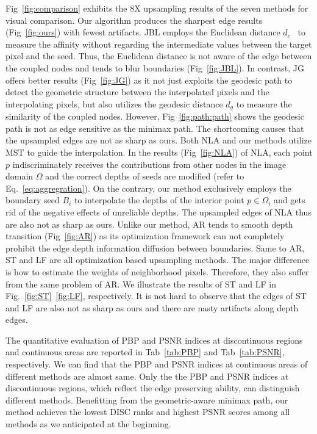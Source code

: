 \documentclass[preprint,10pt,5p,times,twocolumn]{elsarticle}
\begin{document}
Fig~\ref{fig:comparison} exhibits the 8X upsampling results of the seven methods for visual comparison. Our algorithm produces the sharpest edge results (Fig~\ref{fig:ours}) with  fewest artifacts. JBL employs the Euclidean distance $d_e$~\cite{Kopf2007} to measure the affinity without regarding the intermediate values between the target pixel and the seed. Thus, the Euclidean distance is not aware of the edge between the coupled nodes and tends to blur boundaries (Fig~\ref{fig:JBL}). In contrast, JG offers better results (Fig~\ref{fig:JG}) as it not just exploits the geodesic path to detect the geometric structure between the interpolated pixels and the interpolating pixels, but also utilizes the geodesic distance $d_g$ to measure the similarity of the coupled nodes. However, Fig~\ref{fig:path:path} shows the geodesic path is not as edge sensitive as the minimax path. The shortcoming causes that the upsampled edges are not as sharp as ours. Both NLA and our methods utilize MST to guide the interpolation. In the results (Fig~\ref{fig:NLA}) of NLA, each point $p$ indiscriminately receives the contributions from other nodes in the image domain $\Omega$ and the correct depths of seeds are modified (refer to Eq.~\eqref{eq:aggregration}). On the contrary, our method exclusively employs the boundary seed $B_i$ to interpolate the depths of the interior point $p \in \Omega_i$ and gets rid of the negative effects of unreliable depths. The upsampled edges of NLA thus are also not as sharp as ours. Unlike our method, AR tends to smooth depth transition (Fig~\ref{fig:AR}) as its optimization framework can not completely prohibit the edge depth information diffusion between boundaries. Same to AR, ST and LF are all optimization based upsampling methods. The major difference is how to estimate the weights of neighborhood pixels. Therefore, they also suffer from the same problem of AR. We illustrate the results of ST and LF in Fig.~\ref{fig:ST}~\ref{fig:LF}, respectively. It is not hard to observe that the edges of ST and LF  are also not as sharp as ours and there are nasty artifacts along depth edges.

The quantitative evaluation of PBP and PSNR indices at discontinuous regions and continuous areas are reported in Tab~\ref{tab:PBP} and Tab~\ref{tab:PSNR}, respectively. We can find that the PBP and PSNR  indices at continuous areas of different methods are almost same. Only the the PBP and PSNR  indices at discontinuous regions, which reflect the edge preserving ability, can distinguish different methods. Benefitting from the geometric-aware minimax path, our method achieves the lowest DISC ranks and highest PSNR scores among all methods as we anticipated at the beginning.
\end{document}
